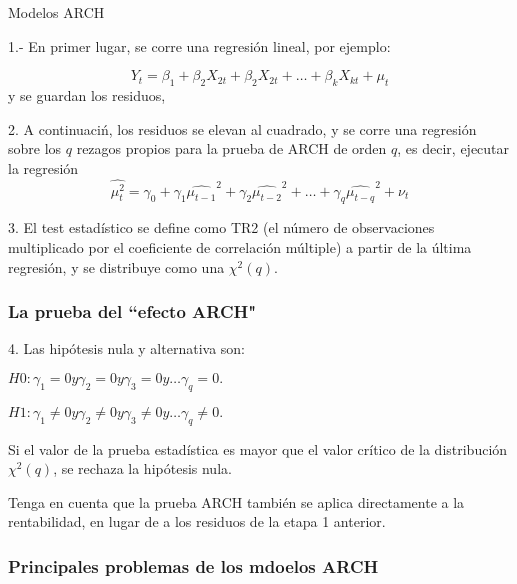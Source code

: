 \documentclass[xcolor=(list of options)]{beamer}
\begin{document}
\begin{section}{Modelos ARCH}
\begin{frame}
1.- En primer lugar, se corre una regresi\'on lineal, por ejemplo:

\begin{equation}
Y_t = \beta_1 + \beta_2 X_{2t} + \beta_2 X_{2t} + \dots{} + \beta_k X_{kt} +\mu_t
\end{equation}
y se guardan los residuos,

2. A continuaci\'n, los residuos se elevan al cuadrado, y se corre una regresi\'on sobre los $q$ rezagos propios para la prueba de ARCH de orden $q$, es decir, ejecutar la regresión
\begin{equation}
\hat{\mu_t^2} = \gamma_0 + \gamma_1 \hat{\mu_{t-1}}^2+ \gamma_2 \hat{\mu_{t-2}}^2+\dots{} +\gamma_{q} \hat{\mu_{t-q}}^2+ \nu_t
\end{equation}

3. El test estad\'{i}stico se define como TR2 (el n\'umero de observaciones multiplicado por el coeficiente de correlaci\'on m\'ultiple) a partir de la \'ultima regresi\'on, y se distribuye como una  $\chi^2(q)$.

\end{frame}

\begin{frame}
\frametitle{La prueba del ``efecto ARCH"}

4. Las hip\'otesis nula y alternativa son:
\vspace{2mm}	

	$H0 : \gamma_1 = 0 y \gamma_2 = 0 y \gamma_3 = 0 y \dots{} \gamma_q = 0.$
	\vspace{2mm}	

	$H1 : \gamma_1 \ne 0 y \gamma_2 \ne 0 y \gamma_3 \ne 0 y \dots{} \gamma_q \ne 0.$
\vspace{2mm}	
    
Si el valor de la prueba estad\'{i}stica es mayor que el valor cr\'{i}tico de la distribuci\'on $\chi^2(q)$, se rechaza la hip\'otesis nula.\\
\vspace{2mm}	

Tenga en cuenta que la prueba ARCH tambi\'en se aplica directamente a la rentabilidad, en lugar de a los residuos de la etapa 1 anterior.

\end{frame}

\begin{frame}
\frametitle{Principales problemas de los mdoelos ARCH}


\end{frame}
\end{section}
\end{document}
